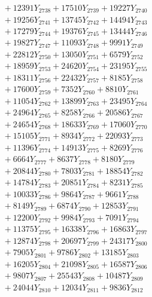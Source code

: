 \documentclass[a4paper,10pt]{article}
\begin{document}
{\begin{align}
&\;  + 12391 Y_{2738} + 17510 Y_{2739} + 19227 Y_{2740} \\[0.3ex]
&\;  + 19256 Y_{2741} + 13745 Y_{2742} + 14494 Y_{2743} \\[0.3ex]
&\;  + 17279 Y_{2744} + 19376 Y_{2745} + 13444 Y_{2746} \\[0.3ex]
&\;  + 19827 Y_{2747} + 11093 Y_{2748} + 9991 Y_{2749} \\[0.3ex]
&\;  + 22812 Y_{2750} + 13050 Y_{2751} + 6579 Y_{2752} \\[0.3ex]
&\;  + 18959 Y_{2753} + 24620 Y_{2754} + 23195 Y_{2755} \\[0.3ex]
&\;  + 18311 Y_{2756} + 22432 Y_{2757} + 8185 Y_{2758} \\[0.5ex]\allowbreak
&\;  + 17600 Y_{2759} + 7352 Y_{2760} + 8810 Y_{2761} \\[0.3ex]
&\;  + 11054 Y_{2762} + 13899 Y_{2763} + 23495 Y_{2764} \\[0.3ex]
&\;  + 24964 Y_{2765} + 8258 Y_{2766} + 20586 Y_{2767} \\[0.3ex]
&\;  + 24654 Y_{2768} + 18633 Y_{2769} + 17060 Y_{2770} \\[0.3ex]
&\;  + 15105 Y_{2771} + 8934 Y_{2772} + 22093 Y_{2773} \\[0.3ex]
&\;  + 11396 Y_{2774} + 14913 Y_{2775} + 8269 Y_{2776} \\[0.3ex]
&\;  + 6664 Y_{2777} + 8637 Y_{2778} + 8180 Y_{2779} \\[0.3ex]
&\;  + 20844 Y_{2780} + 7803 Y_{2781} + 18854 Y_{2782} \\[0.3ex]
&\;  + 14784 Y_{2783} + 20851 Y_{2784} + 8231 Y_{2785} \\[0.3ex]
&\;  + 10033 Y_{2786} + 9864 Y_{2787} + 9661 Y_{2788} \\[0.5ex]\allowbreak
&\;  + 8149 Y_{2789} + 6874 Y_{2790} + 12853 Y_{2791} \\[0.3ex]
&\;  + 12200 Y_{2792} + 9984 Y_{2793} + 7091 Y_{2794} \\[0.3ex]
&\;  + 11375 Y_{2795} + 16338 Y_{2796} + 16863 Y_{2797} \\[0.3ex]
&\;  + 12874 Y_{2798} + 20697 Y_{2799} + 24317 Y_{2800} \\[0.3ex]
&\;  + 7905 Y_{2801} + 9786 Y_{2802} + 13185 Y_{2803} \\[0.3ex]
&\;  + 16205 Y_{2804} + 21098 Y_{2805} + 16587 Y_{2806} \\[0.3ex]
&\;  + 9807 Y_{2807} + 25543 Y_{2808} + 10487 Y_{2809} \\[0.3ex]
&\;  + 24044 Y_{2810} + 12034 Y_{2811} + 9836 Y_{2812} \\[0.3ex]

\end{align}}
\end{document}
